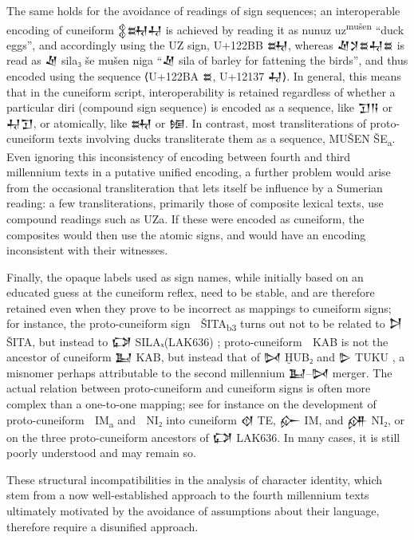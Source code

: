 The same holds for the avoidance of readings of sign sequences; an
interoperable encoding of cuneiform {\oraccnoto 𒉭𒊻𒄷} is achieved by
reading it as nunuz uz\textsuperscript{mušen} “duck eggs”, and
accordingly using the UZ sign, U+122BB {\oraccnoto 𒊻}, whereas
{\oraccnoto 𒑛𒋡𒊺𒄷𒊺} is read as {\oraccnoto 𒑛} sila₃ še mušen niga
“{\oraccnoto 𒑛} sila of barley for fattening the birds”, and thus
encoded using the sequence ⟨U+122BA {\oraccnoto 𒊺}, U+12137
{\oraccnoto 𒄷}⟩. In general, this means that in the cuneiform script,
interoperability is retained regardless of whether a particular diri
(compound sign sequence) is encoded as a sequence, like {\oraccnoto
𒋛𒀀} or {\oraccnoto 𒄷𒋛}, or atomically, like {\oraccnoto 𒊻} or
{\oraccnoto 𒎏}. In contrast, most transliterations of proto-cuneiform
texts involving ducks transliterate them as a sequence, MUŠEN
ŠE\textsubscript{a}. Even ignoring this inconsistency of encoding
between fourth and third millennium texts in a putative unified
encoding, a further problem would arise from the occasional
transliteration that lets itself be influence by a Sumerian reading: a
few transliterations, primarily those of composite lexical texts, use
compound readings such as UZa. If these were encoded as cuneiform, the
composites would then use the atomic signs, and would have an encoding
inconsistent with their witnesses.

Finally, the opaque labels used as sign names, while initially based
on an educated guess at the cuneiform reflex, need to be stable, and
are therefore retained even when they prove to be incorrect as
mappings to cuneiform signs; for instance, the proto-cuneiform sign
{\pcxxv 𒩁} ŠITA\textsubscript{b3} turns out not to be related to
{\oraccnoto 𒋖} ŠITA, but instead to {\oraccnoto 𒔌}
SILAₓ(LAK636) \cite[220]{Wagensonner2016}; proto-cuneiform {\pcxxv 𒡱}
KAB is not the ancestor of cuneiform {\oraccnoto 𒆏} KAB, but instead
that of {\oraccnoto 𒄸} ḪUB₂ and {\oraccnoto 𒌇}
TUKU \cite[274]{Wagensonner2016}, a misnomer perhaps attributable to
the second millennium {\oraccnoto 𒆏}–{\oraccnoto 𒄸} merger. The actual
relation between proto-cuneiform and cuneiform signs is often more
complex than a one-to-one mapping; see for
instance \cite[217]{Wagensonner2016} on the development of
proto-cuneiform {\pcxxv 𒡡} IM\textsubscript{a} and {\pcxxv 𒥋} NI₂ into
cuneiform {\oraccnoto 𒋼} TE, {\oraccnoto 𒅎} IM, and {\oraccnoto 𒉎}
NI₂, or \cite[220]{Wagensonner2016} on the three proto-cuneiform
ancestors of {\oraccnoto 𒔌} LAK636. In many cases, it is still poorly
understood and may remain so.

These structural incompatibilities in the analysis of character
identity, which stem from a now well-established approach to the
fourth millennium texts ultimately motivated by the avoidance of
assumptions about their language, therefore require a disunified
approach.
